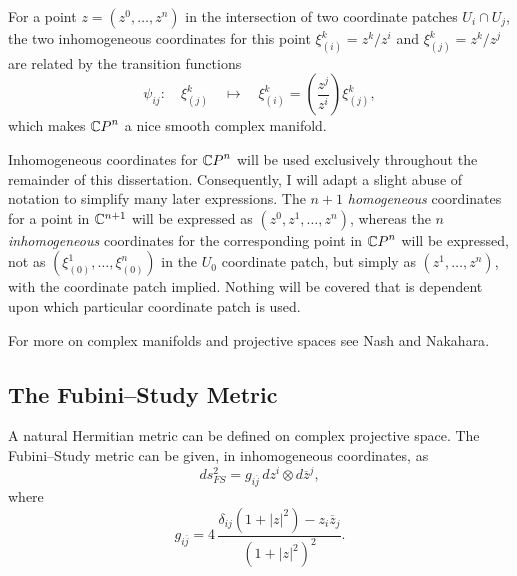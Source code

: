 For a point $z=(z^0,\ldots,z^n)$ in the intersection of 
two coordinate patches $U_i\cap U_j$,
the two inhomogeneous coordinates for this point
$\xi^k_{(i)}={z^k}/{z^i}$ and
$\xi^k_{(j)}={z^k}/{z^j}$
are related by the transition functions
\begin{equation}
\psi_{ij}\colon\quad \xi^k_{(j)}\quad\mapsto
\quad\xi^k_{(i)} = \left( \frac{z^j}{z^i} \right)
\xi^k_{(j)},
\end{equation}
which makes ${\mathbb{C} P}^n$ a nice smooth complex manifold.

Inhomogeneous coordinates for ${\mathbb{C} P}^n$ will be used
exclusively throughout the remainder of this dissertation.
Consequently, I will adapt a slight abuse of notation to simplify
many later expressions.
The $n+1$ \emph{homogeneous} coordinates for a point in ${\mathbb{C}}^{n+1}$ will be expressed
as $(z^0,z^1,\ldots,z^n)$, whereas the $n$ \emph{inhomogeneous} coordinates for the
corresponding point in ${\mathbb{C} P}^n$ will be expressed, not as
$(\xi^1_{(0)},\ldots,\xi^n_{(0)})$ in the $U_0$ coordinate patch, but
simply as $(z^1,\ldots,z^n)$, with the coordinate patch implied.
Nothing will be covered that is dependent upon which 
particular coordinate patch
is used.

For more on complex manifolds and projective spaces
see Nash\cite{Nash:91} and Nakahara\cite{Nakahara:90}.



\subsection{The Fubini--Study Metric}

%
A natural Hermitian metric can be defined on complex projective
space.\cite{Fubini:?,Study:?}
The Fubini--Study metric can be given, in inhomogeneous coordinates, as
\begin{equation}
ds_{FS}^2 = g_{i\overline{j}}\, dz^i\otimes d\overline{z}^j,
\end{equation}
where 
\begin{equation}
g_{i\overline{j}} = 4\,\frac{\delta_{ij}\left( 1 + \left| z \right|^2 \right) - z_i\overline{z}_j }
{ \left( 1 + \left| z\right|^2 \right)^2 }.
\label{e:fsmetric}
\end{equation}


